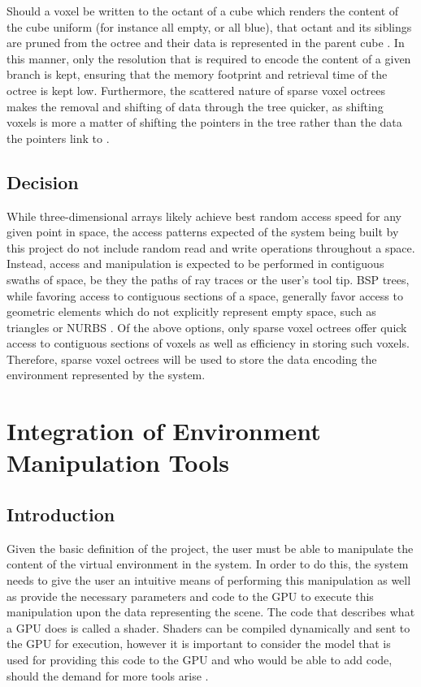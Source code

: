 \documentclass[onecolumn, draftclsnofoot,10pt, compsoc]{IEEEtran}
\begin{document}
Should a voxel be written to the octant of a cube which renders the content of the cube uniform (for instance all empty, or all blue), that octant and its siblings are pruned from the octree and their data is represented in the parent cube \cite{3}.
In this manner, only the resolution that is required to encode the content of a given branch is kept, ensuring that the memory footprint and retrieval time of the octree is kept low.
Furthermore, the scattered nature of sparse voxel octrees makes the removal and shifting of data through the tree quicker, as shifting voxels is more a matter of shifting the pointers in the tree rather than the data the pointers link to \cite{3}.


\subsection{Decision}

While three-dimensional arrays likely achieve best random access speed for any given point in space, the access patterns expected of the system being built by this project do not include random read and write operations throughout a space.
Instead, access and manipulation is expected to be performed in contiguous swaths of space, be they the paths of ray traces or the user's tool tip.
BSP trees, while favoring access to contiguous sections of a space, generally favor access to geometric elements which do not explicitly represent empty space, such as triangles or NURBS \cite{5}.
Of the above options, only sparse voxel octrees offer quick access to contiguous sections of voxels as well as efficiency in storing such voxels.
Therefore, sparse voxel octrees will be used to store the data encoding the environment represented by the system.


\section{Integration of Environment Manipulation Tools}
\subsection{Introduction}

Given the basic definition of the project, the user must be able to manipulate the content of the virtual environment in the system.
In order to do this, the system needs to give the user an intuitive means of performing this manipulation as well as provide the necessary parameters and code to the GPU to execute this manipulation upon the data representing the scene.
The code that describes what a GPU does is called a shader.
Shaders can be compiled dynamically and sent to the GPU for execution, however it is important to consider the model that is used for providing this code to the GPU and who would be able to add code, should the demand for more tools arise \cite{4}.
\end{document}

